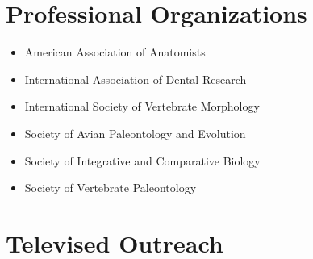 \documentclass[10pt,letterpaper,]{article}
\providecommand{\tightlist}{%
  \setlength{\itemsep}{0pt}\setlength{\parskip}{0pt}}
\begin{document}
\hypertarget{professional-organizations}{%
\section{Professional Organizations}\label{professional-organizations}}

\begin{itemize}
\tightlist
\item
  American Association of Anatomists
\item
  International Association of Dental Research
\item
  International Society of Vertebrate Morphology
\item
  Society of Avian Paleontology and Evolution
\item
  Society of Integrative and Comparative Biology
\item
  Society of Vertebrate Paleontology
\end{itemize}

\hypertarget{televised-outreach}{%
\section{Televised Outreach}\label{televised-outreach}}

\end{document}
